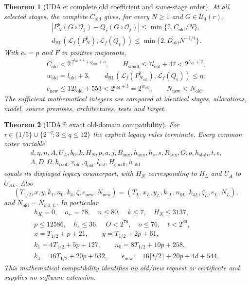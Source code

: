 \documentclass[11pt]{article}
\theoremstyle{plain}
\newtheorem{theorem}{Theorem}[section]
\theoremstyle{definition}
\theoremstyle{remark}
\begin{document}
\begin{theorem}[UDA.e: complete old coefficient and same-stage order]
\label{uda:clause-e}
At all selected stages, the complete $C_{\mathrm{old}}$ gives, for every
$N\ge1$ and $G\in\mathcal U_4(r)$,
\begin{gather*}
 |P_N^b(G\circ\mathcal O_f)-Q_\epsilon(G\circ\mathcal O_f)|
 \le\min\{2,C_{\mathrm{old}}/N\},\\
 d_{\mathrm{BL}}(\mathcal L_f(P_N^b),\mathcal L_f(Q_\epsilon))
 \le\min\{2,D_{\mathrm{old}}N^{-1/4}\}.
\end{gather*}
With $c_*=p$ and $\overline F$ in positive majorants,
\begin{gather*}
 C_{\mathrm{old}}<2^{\,2^{l_{\mathrm{old}}+2}+q_{\mathrm{old}}+o},\qquad
 H_{\mathrm{small}}\le7l_{\mathrm{old}}+47<2^{l_{\mathrm{old}}+2},\\
 w_{\mathrm{old}}=l_{\mathrm{old}}+3,\qquad
 d_{\mathrm{BL}}(\mathcal L_f(P_{N_{\mathrm{old}}}^b),
                  \mathcal L_f(Q_\epsilon))\le\eta,\\
 e_{\mathrm{new}}\le12l_{\mathrm{old}}+553<2^{l_{\mathrm{old}}+3}
 =2^{w_{\mathrm{old}}},\qquad N_{\mathrm{new}}<N_{\mathrm{old}}.
\end{gather*}
The sufficient mathematical integers are compared at identical stages,
allocations, model, source premises, architectures, tests and target.
\end{theorem}

\begin{theorem}[UDA.f: exact old-domain compatibility]
\label{uda:clause-f}
For $\tau\in\{1/5\}\cup\{2^{-q}:3\le q\le12\}$ the explicit legacy
rules terminate. Every common outer variable
\[
\begin{gathered}
 d,\eta,n,A,U_A,b_0,k,H_N,p,a,j,B_{\mathrm{aux}},h_{\mathrm{aux}},h_s,s,
 R_{\mathrm{aux}},O,o,h_{\mathrm{stab}},t,\epsilon,\\
 \Lambda,D,\Omega,h_{\mathrm{root}},v_{\mathrm{old}},q_{\mathrm{old}},
 l_{\mathrm{old}},H_{\mathrm{small}},w_{\mathrm{old}}
\end{gathered}
\]
equals its displayed legacy counterpart, with $H_N$ corresponding to $H_L$
and $U_A$ to $U_{AL}$. Also
\[
 (T_{1/2},x,y,k_1,n_0,k_4,\zeta,e_{\mathrm{new}},N_{\mathrm{new}})
 =(T_L,x_L,y_L,k_{1L},n_{0L},k_{4L},\zeta_L,e_L,N_L),
\]
and $N_{\mathrm{old}}=N_{\mathrm{old},L}$. In particular
\begin{gather*}
 h_K=0,\quad o_+=78,\quad n\le80,\quad k\le7,\quad H_N\le3137,\\
 p\le12586,\quad h_s\le36,\quad O<2^{76},\quad o\le76,\quad t<2^{36},\\
 x=T_{1/2}+p+21,\qquad y=T_{1/2}+2p+61,\\
 k_1=4T_{1/2}+5p+127,\qquad n_0=8T_{1/2}+10p+258,\\
 k_4=16T_{1/2}+20p+532,\qquad
 e_{\mathrm{new}}=16\lceil t/2\rceil+20p+4d+544.
\end{gather*}
This mathematical compatibility identifies no old/new request or certificate
and supplies no software extension.
\end{theorem}
\end{document}
